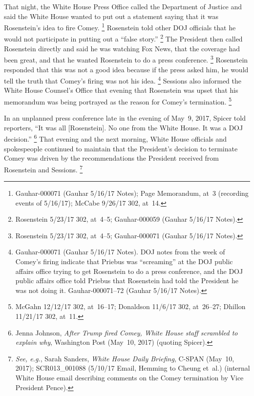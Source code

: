 That night, the White House Press Office called the Department of Justice and said the White House wanted to put out a statement saying that it was Rosenstein's idea to fire Comey.%
\footnote{Gauhar-000071 (Gauhar 5/16/17 Notes);
Page Memorandum, at~3 (recording events of 5/16/17);
McCabe 9/26/17 302, at~14.}
Rosenstein told other DOJ officials that he would not participate in putting out a ``false story.''%
\footnote{Rosenstein 5/23/17 302, at~4--5;
Gauhar-000059 (Gauhar 5/16/17 Notes).}
The President then called Rosenstein directly and said he was watching Fox News, that the coverage had been great, and that he wanted Rosenstein to do a press conference.%
\footnote{Rosenstein 5/23/17 302, at~4--5;
Gauhar-000071 (Gauhar 5/16/17 Notes).}
Rosenstein responded that this was not a good idea because if the press asked him, he would tell the truth that Comey's firing was not his idea.%
\footnote{Gauhar-000071 (Gauhar 5/16/17 Notes).
DOJ notes from the week of Comey's firing indicate that Priebus was ``screaming'' at the DOJ public affairs office trying to get Rosenstein to do a press conference, and the DOJ public affairs office told Priebus that Rosenstein had told the President he was not doing it.
Gauhar-000071--72 (Gauhar 5/16/17 Notes).}
Sessions also informed the White House Counsel's Office that evening that Rosenstein was upset that his memorandum was being portrayed as the reason for Comey's termination.%
\footnote{McGahn 12/12/17 302, at~16--17;
Donaldson 11/6/17 302, at~26--27;
Dhillon 11/21/17 302, at~11.}

In an unplanned press conference late in the evening of May~9, 2017, Spicer told reporters, ``It was all [Rosenstein].
No one from the White House.
It was a DOJ decision.''%
\footnote{Jenna Johnson, \textit{After Trump fired Comey, White House staff scrambled to explain why}, Washington Post (May~10, 2017) (quoting Spicer).}
That evening and the next morning, White House officials and spokespeople continued to maintain that the President's decision to terminate Comey was driven by the recommendations the President received from Rosenstein and Sessions.%
\footnote{\textit{See, e.g.}, Sarah Sanders, \textit{White House Daily Briefing}, C-SPAN (May~10, 2017);
SCR013\_001088 (5/10/17 Email, Hemming to Cheung et~al.) (internal White House email describing comments on the Comey termination by Vice President Pence).}


